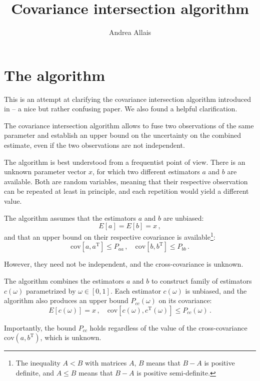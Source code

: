\documentclass[11pt]{article}
\title{Covariance intersection algorithm}
\author{Andrea Allais}
\date{}
\newcommand{\cov}{\mathrm{cov}}
\newcommand{\transpose}{\mathrm{\scriptscriptstyle T}}
\begin{document}
\maketitle
\section{The algorithm}

This is an attempt at clarifying the covariance intersection algorithm
introduced in \cite{julier1997} -- a nice but rather confusing paper. We also
found \cite{chen2002} a helpful clarification.

The covariance intersection algorithm allows to fuse two observations of the
same parameter and establish an upper bound on the uncertainty on the combined
estimate, even if the two observations are not independent.

The algorithm is best understood from a frequentist point of view. There is an
unknown parameter vector $x$, for which two different estimators $a$ and $b$
are available. Both are random variables, meaning that their respective
observation can be repeated at least in principle, and each repetition would
yield a different value. 

The algorithm assumes that the estimators $a$ and $b$ are unbiased:
\begin{equation}
E[a] = E[b] = x\,,
\end{equation}
and that an upper bound on their respective covariance is
available\footnote{The inequality $A < B$ with matrices $A$, $B$ means that $B
- A$ is positive definite, and $A \le B$ means that $B - A$ is positive
semi-definite.}:
\begin{equation}
\cov \left[a, a^\transpose\right] \le P_{aa}\,,\quad
\cov \left[b, b^\transpose\right] \le P_{bb}\,.
\end{equation}

However, they need not be independent, and the cross-covariance is unknown.

The algorithm combines the estimators $a$ and $b$ to construct family of
estimators $c(\omega)$ parametrized by $\omega \in [0, 1]$.  Each estimator
$c(\omega)$ is unbiased, and the algorithm also produces an upper bound
$P_{cc}(\omega)$ on its covariance:
\begin{equation}
    E[c(\omega)] = x\,,\quad
    \cov \left[c(\omega), c^\transpose(\omega)\right] \le P_{cc}(\omega)\,.
\end{equation}

Importantly, the bound $P_{cc}$ holds regardless of the value of the
cross-covariance $\cov(a, b^\transpose)$, which is unknown.
\end{document}
